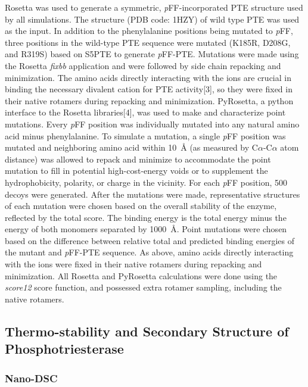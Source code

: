 \begin{refsection}
Rosetta\cite{Leaver-Fay2011,DiMaio2011a} was used to generate a symmetric,
\emph{p}FF-incorporated PTE structure used by all simulations. The structure
(PDB code: 1HZY) of wild type PTE was used as the input. In addition to the
phenylalanine positions being mutated to \emph{p}FF, three positions in the
wild-type PTE sequence were mutated (K185R, D208G, and R319S) based on S5PTE to
generate \emph{p}FF-PTE.\cite{Roodveldt2005} Mutations were made using the
Rosetta \emph{fixbb} application and were followed by side chain repacking and
minimization. The amino acids directly interacting with the  ions
are crucial in binding the necessary divalent cation for PTE activity[3], so
they were fixed in their native rotamers during repacking and minimization.
PyRosetta, a python interface to the Rosetta libraries[4], was used to make and
characterize point mutations. Every \emph{p}FF position was individually
mutated into any natural amino acid minus phenylalanine. To simulate a
mutation, a single \emph{p}FF position was mutated and neighboring amino acid
within \SI{10}{\AA} (as measured by C$\alpha$-C$\alpha$ atom distance) was
allowed to repack and minimize to accommodate the point mutation to fill in
potential high-cost-energy voids or to supplement the hydrophobicity, polarity,
or charge in the vicinity. For each \emph{p}FF position, 500 decoys were
generated. After the mutations were made, representative structures of each
mutation were chosen based on the overall stability of the enzyme, reflected by
the total score. The binding energy is the total energy minus the energy of
both monomers separated by \SI{1000}{\AA}. Point mutations were chosen based on
the difference between relative total and predicted binding energies of the
mutant and \emph{p}FF-PTE sequence. As above, amino acids directly interacting
with the  ions were fixed in their native rotamers during repacking
and minimization. All Rosetta and PyRosetta calculations were done using the
\emph{score12} score function, and possessed extra rotamer sampling, including
the native rotamers.

\subsection{Thermo-stability and Secondary Structure of Phosphotriesterase}
\label{sec:thermo}

\subsubsection{Nano-DSC}
\label{sec:dsc-method}


\end{refsection}
